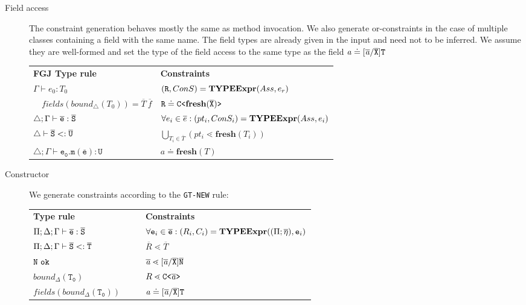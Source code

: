 \begin{description}
\item[Field access]
The constraint generation behaves mostly the same as method invocation.
We also generate or-constraints in the case of multiple classes containing a field with the same name.
The field types are already given in the input and need not to be inferred.
We assume they are well-formed and set the type of the field access to the same type as the field $\mathit{ a } \doteq
[\overline{\mathit{ a }}/\overline{\tt X}]\texttt{T}$

 \begin{tabular}{l|l}
   \textbf{FGJ Type rule} & \textbf{Constraints} \\
   $\Gamma \vdash e_0:T_0$ & $(\texttt{R}, ConS) = \textbf{TYPEExpr}(Ass, e_r)$\\ 
   $\quad \mathit{fields}(\mathit{bound}_\triangle(T_0)) = \overline{T} \ \overline{f}$ & $\texttt{R} \doteq \mathtt{C \texttt{<} \textbf{fresh}(\overline{\tt X}) \texttt{>} }$ \\
  $\triangle; \Gamma \vdash \overline{\tt e} : \overline{\tt S}$ & $\forall e_i \in \overline{e} : (pt_i, ConS_i) = \textbf{TYPEExpr}(Ass, e_i)$\\
  $\triangle \vdash \overline{\tt S} <: \overline{\tt U}$ & $ \bigcup_{T_i \in \overline{T}} (pt_i \lessdot \textbf{fresh}(T_i))$\\
  $\triangle; \Gamma \vdash \mathtt{e_0.m(\overline{e}) : U }$ & $a \doteq \textbf{fresh}(T)$ \\
 \end{tabular}
 \fi
 \item[Constructor] We generate constraints according to the \texttt{GT-NEW} rule:\\
 \begin{tabularx}{\linewidth}{lX|Xl}
  \textbf{\TFGJ{} Type rule} &&& \textbf{Constraints} \\
  $\Pi;\Delta;\Gamma \vdash \overline{\tt e} : \overline{\tt S}$ &&& $\forall \texttt{e}_i \in \overline{\texttt{e}} : (R_i, C_i) = \textbf{TYPEExpr}(({\Pi} ;
  \overline{\mathtt{\eta}}), \texttt{e}_i)$\\
  $\Pi;\Delta;\Gamma \vdash \overline{\tt S} <: \overline{\tt T}$ &&& $\overline{R} \lessdot \overline{T}$\\
  $\type{N}\ \texttt{ok}$ &&& $\overline{\mathit{ a }} \lessdot
  [\overline{\mathit{ a }}/\overline{\tt X}]\overline{\tt N}$\\
  $\mathtt{\mathit{bound}_\Delta (T_0)}$ &&& ${R} \lessdot \mathtt{C \texttt{<} \overline{\tt \mathit{ a }} \texttt{>} }$ \\
  $\mathtt{\mathit{fields}(\mathit{bound}_\Delta (T_0))}$ &&& $\mathit{ a } \doteq [\overline{\mathit{ a }}/\overline{\tt X}]\texttt{T}$
\end{tabularx}


\end{description}
